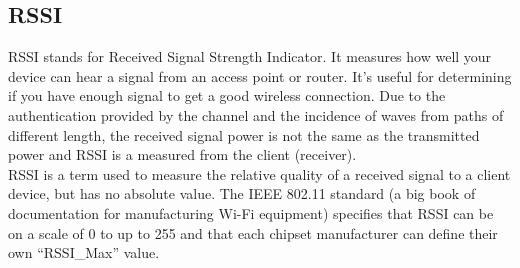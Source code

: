 \subsection{RSSI}
RSSI stands for Received Signal Strength Indicator. It measures how well your device can hear a signal from an access point or router. It’s useful for determining if you have enough signal to get a good wireless connection. Due to the authentication provided by the channel and the incidence of waves from paths of different length, the received signal power is not the same as the transmitted power and RSSI is a measured from the client (receiver). \\
RSSI is a term used to measure the relative quality of a received signal to a client device, but has no absolute value. The IEEE 802.11 standard (a big book of documentation for manufacturing Wi-Fi equipment) specifies that RSSI can be on a scale of 0 to up to 255 and that each chipset manufacturer can define their own “RSSI\_Max” value.  \\
